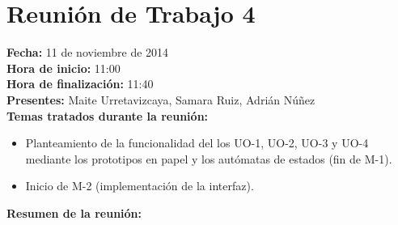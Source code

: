 \section*{Reunión de Trabajo 4}

\textbf{Fecha:} 11 de noviembre de 2014\\

\textbf{Hora de inicio:} 11:00\\

\textbf{Hora de finalización:} 11:40\\

\textbf{Presentes:} Maite Urretavizcaya, Samara Ruiz, Adrián Núñez\\

\textbf{Temas tratados durante la reunión:}

\begin{itemize}
\item Planteamiento de la funcionalidad del los UO-1, UO-2, UO-3 y UO-4 mediante los prototipos en papel y los autómatas de estados (fin de M-1).

\item Inicio de M-2 (implementación de la interfaz).
\end{itemize}

\textbf{Resumen de la reunión:}

